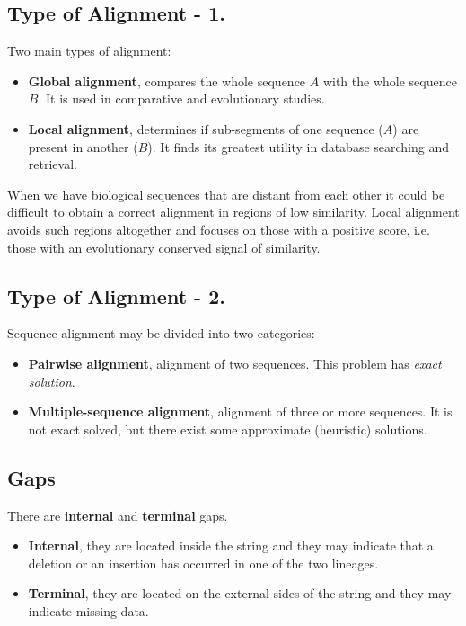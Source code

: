 \subsection{Type of Alignment - 1.}
Two main types of alignment:
\begin{itemize}
	\item \textbf{Global alignment}, compares the whole sequence $A$ with the whole sequence $B$. It is used in comparative and evolutionary studies.
	
	\item \textbf{Local alignment}, determines if sub-segments of one sequence ($A$) are present in another ($B$). It finds its greatest utility in database searching and retrieval. 
\end{itemize}
When we have biological sequences that are distant from each other it could be difficult to obtain a correct alignment in regions of low similarity. Local alignment avoids such regions altogether and focuses on those with a positive score, i.e. those with an evolutionary conserved signal of similarity.

\subsection{Type of Alignment - 2.}
Sequence alignment may be divided into two categories:
\begin{itemize}
	\item \textbf{Pairwise alignment}, alignment of two sequences. This problem has \textit{exact solution}.
	\item \textbf{Multiple-sequence alignment}, alignment of three or more sequences. It is not exact solved, but there exist some approximate (heuristic) solutions.
\end{itemize}

\subsection{Gaps}
There are \textbf{internal} and \textbf{terminal} gaps.
\begin{itemize}
	\item \textbf{Internal}, they are located inside the string and they may indicate that a deletion or an insertion has occurred in one of the two lineages.
	\item \textbf{Terminal}, they are located on the external sides of the string and they may indicate missing data.
\end{itemize}

